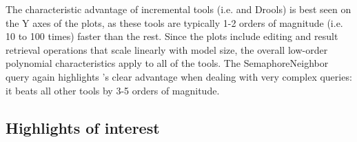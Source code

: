 % 

The characteristic advantage of incremental tools (i.e. \eiq{} and Drools) is best seen on the Y axes of the plots, as these tools are typically 1-2 orders of magnitude (i.e. 10 to 100 times) faster than the rest. Since the plots include editing and result retrieval operations that scale linearly with model size, the overall low-order polynomial characteristics apply to all of the tools. The \textsf{SemaphoreNeighbor} query again highlights \eiq's clear advantage when dealing with very complex queries: it beats all other tools by 3-5 orders of magnitude.


% 

 
 

\subsection{Highlights of interest}

